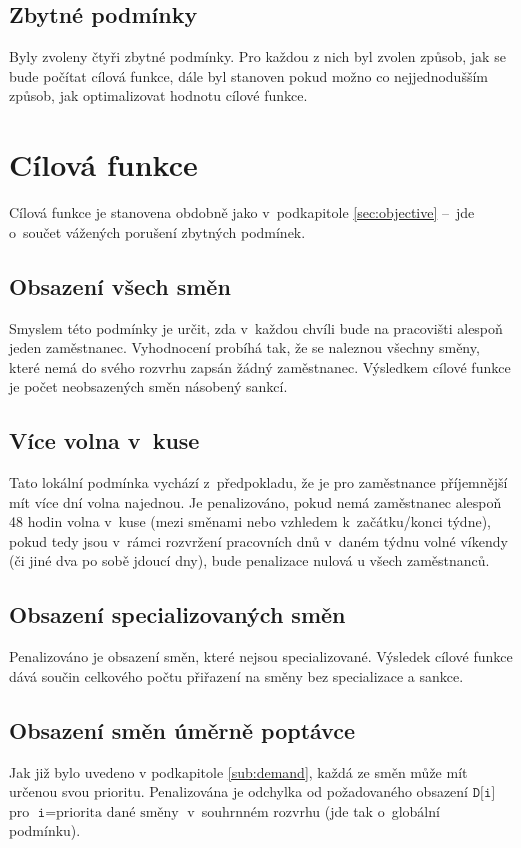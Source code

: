 \documentclass[twoside]{ctuthesis}
\begin{document}
\subsection{Zbytné podmínky}
Byly zvoleny čtyři zbytné podmínky. Pro každou z nich byl zvolen způsob, jak se bude počítat cílová funkce, dále byl stanoven pokud možno co nejjednodušším způsob, jak optimalizovat hodnotu cílové funkce. %

\section{Cílová funkce}
Cílová funkce je stanovena obdobně jako v~podkapitole \ref{sec:objective} – jde o~součet vážených porušení zbytných podmínek.

\subsection{Obsazení všech směn}

Smyslem této podmínky je určit, zda v~každou chvíli bude na pracovišti alespoň jeden zaměstnanec. Vyhodnocení probíhá tak, že se naleznou všechny směny, které nemá do svého rozvrhu zapsán žádný zaměstnanec. Výsledkem cílové funkce je počet neobsazených směn násobený sankcí.

\subsection{Více volna v~kuse}
Tato lokální podmínka vychází z~předpokladu, že je pro zaměstnance příjemnější mít více dní volna najednou. Je penalizováno, pokud nemá zaměstnanec alespoň 48 hodin volna v~kuse (mezi směnami nebo vzhledem k~začátku/konci týdne), pokud tedy jsou v~rámci rozvržení pracovních dnů v~daném týdnu volné víkendy (či jiné dva po sobě jdoucí dny), bude penalizace nulová u všech zaměstnanců.

\subsection{Obsazení specializovaných směn}
Penalizováno je obsazení směn, které nejsou specializované. Výsledek cílové funkce dává součin celkového počtu přiřazení na směny bez specializace a sankce.

\subsection{Obsazení směn úměrně poptávce}
Jak již bylo uvedeno v podkapitole \ref{sub:demand}, každá ze směn může mít určenou svou prioritu. Penalizována je odchylka od požadovaného obsazení $\texttt{D[i]}$ pro $\texttt{i} = \mbox{priorita dané směny}$ v~souhrnném rozvrhu (jde tak o~globální podmínku).
\end{document}
